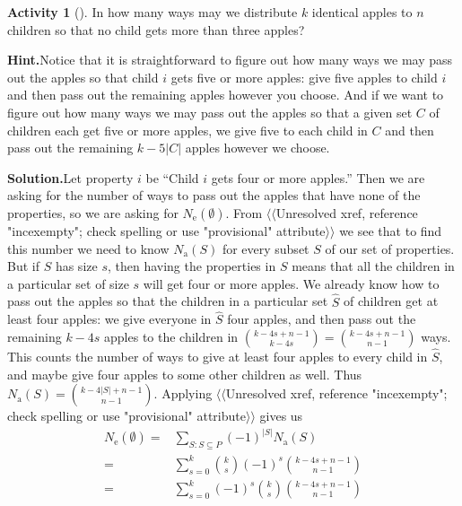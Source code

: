 \documentclass[10pt,]{book}
\theoremstyle{plain}
\theoremstyle{definition}
\newtheorem{activity}[project]{Activity}
\numberwithin{equation}{chapter}
\newcommand{\amp}{&}
\begin{document}
\begin{activity}[]\label{activity-229}
In how many ways may we distribute \(k\) identical apples to \(n\) children so that no child gets more than three apples?%
\par\medskip\noindent%
\textbf{Hint.}\quad Notice that it is straightforward to figure out how many ways we may pass out the apples so that child \(i\) gets five or more apples: give five apples to child \(i\) and then pass out the remaining apples however you choose. And if  we want to figure out how many ways we may pass out the apples so that a given set \(C\) of children each get five or more apples, we give five to each child in \(C\) and then pass out the remaining \(k-5|C|\) apples however we choose.%
\par\medskip\noindent%
\textbf{Solution.}\quad Let property \(i\) be ``Child \(i\) gets four or more apples.'' Then we are asking for the number of ways to pass out the apples that have none of the properties, so we are asking for \(N_{\mbox{e} }(\emptyset)\). From {$\langle\langle$Unresolved xref, reference "incexempty"; check spelling or use "provisional" attribute$\rangle\rangle$} we see that to find this number we need to know \(N_{\mbox{a} }(S)\) for every subset \(S\) of our set of properties. But if \(S\) has size \(s\), then having the properties in \(S\) means that all the children in a particular set of size \(s\) will get four or more apples. We already know how to pass out the apples so that the children in a particular set \(\hat S\) of children get at least four apples: we give everyone in \(\hat
S\) four apples, and then pass out the remaining \(k-4s\) apples to the children in \(\binom{k-4s+n-1}{k-4s}= \binom{k-4s+n-1}{n-1}\) ways. This counts the number of ways to give at least four apples to every child in \(\hat S\), and maybe give four apples to some other children as well. Thus \(N_{\mbox{a} }(S) = \binom{k-4|S|+n-1}{n-1}\). Applying {$\langle\langle$Unresolved xref, reference "incexempty"; check spelling or use "provisional" attribute$\rangle\rangle$} gives us%
\begin{align*}
N_{\mbox{e} }(\emptyset) =\amp \sum_{S:S\subseteq
P}(-1)^{|S|}N_{\mbox{a} }(S)\\
=\amp \sum_{s=0}^k \binom{k}{s}(-1)^s \binom{k-4s+n-1}{n-1}\\
=\amp \sum_{s=0}^k (-1)^s\binom{k}{s}\binom{k-4s+n-1}{n-1}
\end{align*}
%
\end{activity}
\typeout{************************************************}
\typeout{************************************************}
\end{document}
